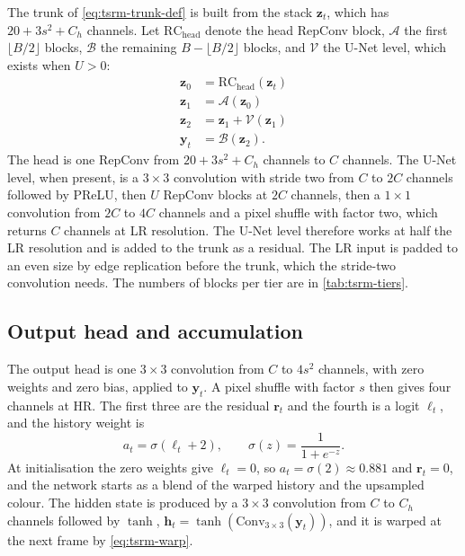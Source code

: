The trunk of \cref{eq:tsrm-trunk-def} is built from the stack $\mathbf{z}_t$, which has $20+3s^2+C_h$ channels. Let $\mathrm{RC}_{\mathrm{head}}$ denote the head RepConv block, $\mathcal{A}$ the first $\lfloor B/2\rfloor$ blocks, $\mathcal{B}$ the remaining $B-\lfloor B/2\rfloor$ blocks, and $\mathcal{V}$ the U-Net level, which exists when $U>0$:
\begin{align}
\mathbf{z}_0&=\mathrm{RC}_{\mathrm{head}}(\mathbf{z}_t) \label{eq:tsrm-trunk-def}\\
\mathbf{z}_1&=\mathcal{A}(\mathbf{z}_0)\nonumber\\
\mathbf{z}_2&=\mathbf{z}_1+\mathcal{V}(\mathbf{z}_1)\nonumber\\
\mathbf{y}_t&=\mathcal{B}(\mathbf{z}_2).\nonumber
\end{align}
The head is one RepConv from $20+3s^2+C_h$ channels to $C$ channels. The U-Net level, when present, is a $3\times3$ convolution with stride two from $C$ to $2C$ channels followed by PReLU, then $U$ RepConv blocks at $2C$ channels, then a $1\times1$ convolution from $2C$ to $4C$ channels and a pixel shuffle with factor two, which returns $C$ channels at LR resolution. The U-Net level therefore works at half the LR resolution and is added to the trunk as a residual. The LR input is padded to an even size by edge replication before the trunk, which the stride-two convolution needs. The numbers of blocks per tier are in \cref{tab:tsrm-tiers}.

\subsection{Output head and accumulation}\label{sec:tsrm-output}

The output head is one $3\times3$ convolution from $C$ to $4s^2$ channels, with zero weights and zero bias, applied to $\mathbf{y}_t$. A pixel shuffle with factor $s$ \cite{shi2016espcn} then gives four channels at HR. The first three are the residual $\mathbf{r}_t$ and the fourth is a logit $\ell_t$, and the history weight is
\begin{equation}\label{eq:tsrm-alpha}
a_t=\sigma(\ell_t+2),\qquad \sigma(z)=\frac{1}{1+e^{-z}}.
\end{equation}
At initialisation the zero weights give $\ell_t=0$, so $a_t=\sigma(2)\approx0.881$ and $\mathbf{r}_t=0$, and the network starts as a blend of the warped history and the upsampled colour. The hidden state is produced by a $3\times3$ convolution from $C$ to $C_h$ channels followed by $\tanh$, $\mathbf{h}_t=\tanh(\mathrm{Conv}_{3\times3}(\mathbf{y}_t))$, and it is warped at the next frame by \cref{eq:tsrm-warp}.

